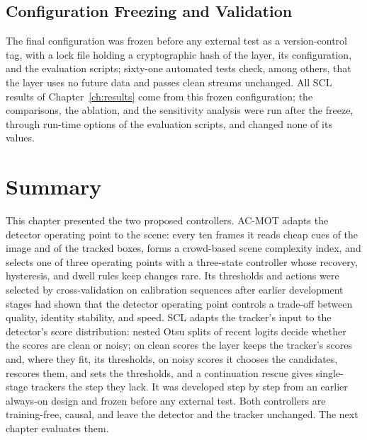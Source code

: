 \subsection{Configuration Freezing and Validation}\label{sec:scl-freeze}
The final configuration was frozen before any external test as a version-control tag, with a lock file holding a cryptographic hash of the layer, its configuration, and the evaluation scripts; sixty-one automated tests check, among others, that the layer uses no future data and passes clean streams unchanged. All SCL results of Chapter~\ref{ch:results} come from this frozen configuration; the comparisons, the ablation, and the sensitivity analysis were run after the freeze, through run-time options of the evaluation scripts, and changed none of its values.

\section{Summary}\label{sec:prop-summary}
This chapter presented the two proposed controllers. AC-MOT adapts the detector operating point to the scene: every ten frames it reads cheap cues of the image and of the tracked boxes, forms a crowd-based scene complexity index, and selects one of three operating points with a three-state controller whose recovery, hysteresis, and dwell rules keep changes rare. Its thresholds and actions were selected by cross-validation on calibration sequences after earlier development stages had shown that the detector operating point controls a trade-off between quality, identity stability, and speed. SCL adapts the tracker's input to the detector's score distribution: nested Otsu splits of recent logits decide whether the scores are clean or noisy; on clean scores the layer keeps the tracker's scores and, where they fit, its thresholds, on noisy scores it chooses the candidates, rescores them, and sets the thresholds, and a continuation rescue gives single-stage trackers the step they lack. It was developed step by step from an earlier always-on design and frozen before any external test. Both controllers are training-free, causal, and leave the detector and the tracker unchanged. The next chapter evaluates them.
